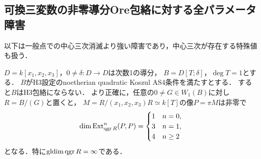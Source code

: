 \subsection{可換三変数の非零導分Ore包絡に対する全パラメータ障害}
\label{sec:ore-point-obstruction}
以下は一般点での中心三次消滅より強い障害であり，中心三次が存在する特殊値も扱う．

\begin{theorem}[Ore軸のpoint対象の無限自己Ext]
\label{thm:h3-polynomial-ore-exclusion}
$D=k[x_1,x_2,x_3]$，$0\ne\delta:D\to D$は次数1の導分，
$B=D[T;\delta]$，$\deg T=1$とする．
$B$がH3設定のnoetherian quadratic Koszul AS4条件を満たすとする．
すると$B$はH3包絡にならない．
より正確に，任意の$0\ne G\in W_1(B)$に対し$R=B/(G)$と置くと，
$M=R/(x_1,x_2,x_3)R\simeq k[T]$の像$P=\pi M$は非零で
\[
 \dim\operatorname{Ext}^n_{\operatorname{qgr} R}(P,P)=
 \begin{cases}1&n=0,\\3&n=1,\\4&n\ge2\end{cases}
\]
となる．特に$\operatorname{gldim}\operatorname{qgr} R=\infty$である．
\end{theorem}
